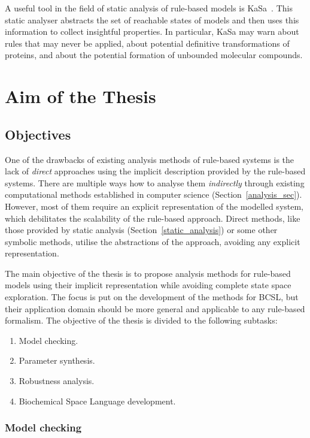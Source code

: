 \documentclass[11pt,a4paper]{report}
\begin{document}
A useful tool in the field of static analysis of rule-based models is KaSa~\cite{boutillier2018kasa}. This static analyser abstracts the set of reachable states of models and then uses this information to collect insightful properties. In particular, KaSa may warn about rules that may never be applied, about potential definitive transformations of proteins, and about the potential formation of unbounded molecular compounds.

\chapter{Aim of the Thesis} \label{chap:aim}

\section{Objectives}

One of the drawbacks of existing analysis methods of rule-based systems is the lack of \emph{direct} approaches using the implicit description provided by the rule-based systems. There are multiple ways how to analyse them \emph{indirectly} through existing computational methods established in computer science (Section~\ref{analysis_sec}). However, most of them require an explicit representation of the modelled system, which debilitates the scalability of the rule-based approach. Direct methods, like those provided by static analysis (Section~\ref{static_analysis}) or some other symbolic methods, utilise the abstractions of the approach, avoiding any explicit representation. 

The main objective of the thesis is to propose analysis methods for rule-based models using their implicit representation while avoiding complete state space exploration. The focus is put on the development of the methods for BCSL, but their application domain should be more general and applicable to any rule-based formalism. The objective of the thesis is divided to the following subtasks:

\begin{enumerate}
	\setlength\itemsep{0.001cm}
	\item Model checking.
	\item Parameter synthesis.
	\item Robustness analysis.
	\item Biochemical Space Language development.
\end{enumerate}

\subsection{Model checking}
\end{document}

